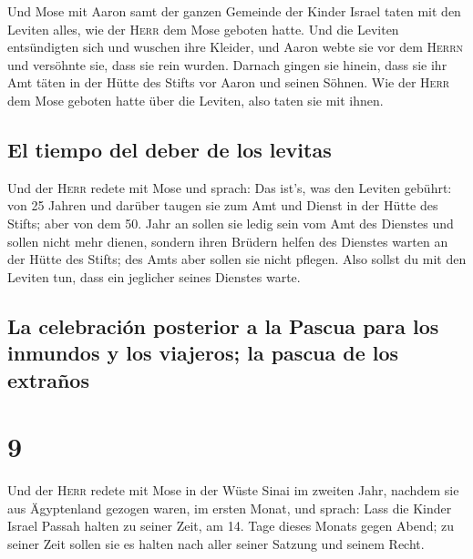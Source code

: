  Und Mose mit Aaron samt der ganzen Gemeinde der Kinder
Israel taten mit den Leviten alles, wie der \textsc{Herr} dem Mose
geboten hatte.  Und die Leviten entsündigten sich und
wuschen ihre Kleider, und Aaron webte sie vor dem \textsc{Herrn} und
versöhnte sie, dass sie rein wurden.  Darnach gingen sie
hinein, dass sie ihr Amt täten in der Hütte des Stifts vor Aaron und
seinen Söhnen. Wie der \textsc{Herr} dem Mose geboten hatte über die
Leviten, also taten sie mit ihnen.

\hypertarget{el-tiempo-del-deber-de-los-levitas}{%
\subsection{El tiempo del deber de los
levitas}\label{el-tiempo-del-deber-de-los-levitas}}

 Und der \textsc{Herr} redete mit Mose und sprach:
 Das ist's, was den Leviten gebührt: von 25 Jahren und
darüber taugen sie zum Amt und Dienst in der Hütte des Stifts;
 aber von dem 50. Jahr an sollen sie ledig sein vom Amt
des Dienstes und sollen nicht mehr dienen,  sondern ihren
Brüdern helfen des Dienstes warten an der Hütte des Stifts; des Amts
aber sollen sie nicht pflegen. Also sollst du mit den Leviten tun, dass
ein jeglicher seines Dienstes warte.

\hypertarget{la-celebraciuxf3n-posterior-a-la-pascua-para-los-inmundos-y-los-viajeros-la-pascua-de-los-extrauxf1os}{%
\subsection{La celebración posterior a la Pascua para los inmundos y los
viajeros; la pascua de los
extraños}\label{la-celebraciuxf3n-posterior-a-la-pascua-para-los-inmundos-y-los-viajeros-la-pascua-de-los-extrauxf1os}}

\hypertarget{section-8}{%
\section{9}\label{section-8}}

 Und der \textsc{Herr} redete mit Mose in der Wüste Sinai
im zweiten Jahr, nachdem sie aus Ägyptenland gezogen waren, im ersten
Monat, und sprach:  Lass die Kinder Israel Passah halten
zu seiner Zeit,  am 14. Tage dieses Monats gegen Abend; zu
seiner Zeit sollen sie es halten nach aller seiner Satzung und seinem
Recht.

